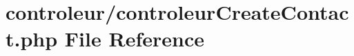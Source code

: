 \hypertarget{controleur_create_contact_8php}{}\section{controleur/controleur\+Create\+Contact.php File Reference}
\label{controleur_create_contact_8php}
